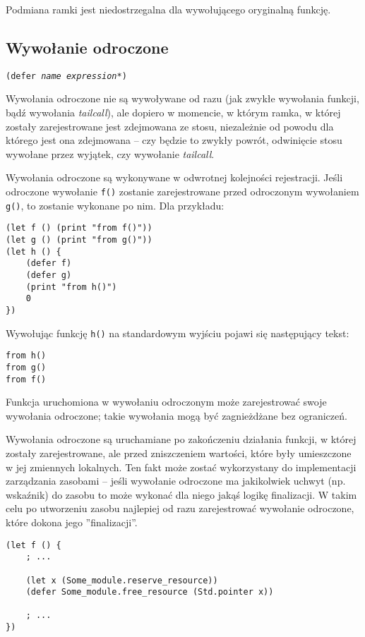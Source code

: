 Podmiana ramki jest niedostrzegalna dla wywołującego oryginalną funkcję.

\subsection{Wywołanie odroczone}

\texttt{(defer \emph{name} \emph{expression}*)}
\newline

Wywołania odroczone nie są wywoływane od razu (jak zwykłe wywołania funkcji, bądź wywołania \emph{tailcall}),
ale dopiero w momencie, w którym ramka, w której zostały zarejestrowane jest zdejmowana ze stosu, niezależnie
od powodu dla którego jest ona zdejmowana -- czy będzie to zwykły powrót, odwinięcie stosu wywołane przez
wyjątek, czy wywołanie \emph{tailcall}.

Wywołania odroczone są wykonywane w odwrotnej kolejności rejestracji. Jeśli odroczone wywołanie \texttt{f()}
zostanie zarejestrowane przed odroczonym wywołaniem \texttt{g()}, to zostanie wykonane po nim. Dla przykładu:

\begin{lstlisting}
(let f () (print "from f()"))
(let g () (print "from g()"))
(let h () {
    (defer f)
    (defer g)
    (print "from h()")
    0
})
\end{lstlisting}

Wywołując funkcję \texttt{h()} na standardowym wyjściu pojawi się następujący tekst:

\begin{verbatim}
from h()
from g()
from f()
\end{verbatim}

Funkcja uruchomiona w wywołaniu odroczonym może zarejestrować swoje wywołania odroczone; takie wywołania
mogą być zagnieżdżane bez ograniczeń.

Wywołania odroczone są uruchamiane po zakończeniu działania funkcji, w której zostały zarejestrowane, ale
przed zniszczeniem wartości, które były umieszczone w jej zmiennych lokalnych. Ten fakt może zostać
wykorzystany do implementacji zarządzania zasobami -- jeśli wywołanie odroczone ma jakikolwiek uchwyt (np.
wskaźnik) do zasobu to może wykonać dla niego jakąś logikę finalizacji. W takim celu po utworzeniu zasobu
najlepiej od razu zarejestrować wywołanie odroczone, które dokona jego ''finalizacji''.

\begin{lstlisting}
(let f () {
    ; ...

    (let x (Some_module.reserve_resource))
    (defer Some_module.free_resource (Std.pointer x))

    ; ...
})
\end{lstlisting}

